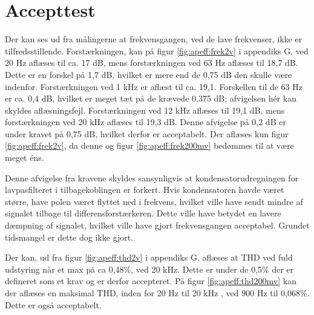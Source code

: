 \section{Accepttest}
Der kan ses ud fra målingerne at frekvensgangen, ved de lave frekvenser, ikke er tilfredsstillende. Forstærkningen, kan på figur \ref{fig:apeff:frek2v} i appendiks G, ved 20 Hz aflæses til ca. 17 dB, mens forstærkningen ved 63 Hz aflæses til 18,7 dB. Dette er en forskel på 1,7 dB, hvilket er mere end de 0,75 dB den skulle være indenfor. Forstærkningen ved 1 kHz er aflæst til ca. 19,1. Forskellen til de 63 Hz er ca. 0,4 dB, hvilket er meget tæt på de krævede 0,375 dB; afvigelsen hér kan skyldes aflæsningsfejl. Forstærkningen ved 12 kHz aflæses til 19,1 dB, mens forstærkningen ved 20 kHz aflæses til 19,3 dB. Denne afvigelse på 0,2 dB er under kravet på 0,75 dB, hvilket derfor er acceptabelt. Der aflæses kun figur \ref{fig:apeff:frek2v}, da denne og figur \ref{fig:apeff:frek200mv} bedømmes til at være meget éns.

Denne afvigelse fra kravene skyldes sansynligvis at kondensatorudregningen for lavpasfilteret i tilbagekoblingen er forkert. Hvis kondensatoren havde været større, have polen været flyttet ned i frekvens, hvilket ville have sendt mindre af signalet tilbage til differensforstærkeren. Dette ville have betydet en lavere dæmpning af signalet, hvilket ville have gjort frekvensgangen acceptabel. Grundet tidsmangel er dette dog ikke gjort.

Der kan, ud fra figur \ref{fig:apeff:thd2v} i appendiks G, aflæses at THD ved fuld udstyring når et max på ca 0,48\%, ved 20 kHz. Dette er under de 0,5\% der er defineret som et krav og er derfor accepteret. På figur \ref{fig:apeff:thd200mv} kan der aflæses en maksimal THD, inden for 20 Hz til 20 kHz , ved 900 Hz til 0,068\%. Dette er også acceptabelt.